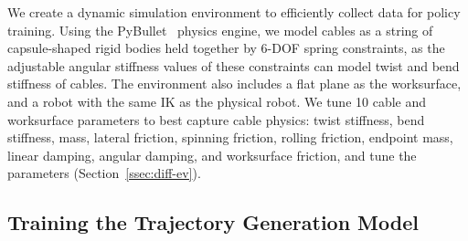 \documentclass[letterpaper, 10 pt, conference]{ieeeconf}  %
\newcommand{\remark}[3]{{\color{#2}[#1: #3]}}
\newcommand{\daniel}[1]{\remark{Daniel}{blue}{#1}}
\newcommand{\Vincent}[1]{\remark{Vincent}{purple}{#1}}
\newcommand{\jeffi}[1]{\remark{JI}{red}{#1}}
\begin{document}
We create a dynamic simulation environment to efficiently collect data for policy training. Using the PyBullet~\cite{coumans2019} physics engine, we model cables as a string of capsule-shaped rigid bodies held together by 6-DOF spring constraints, as the adjustable angular stiffness values of these constraints can model twist and bend stiffness of cables. The environment also includes a flat plane as the worksurface, and a robot with the same IK as the physical robot. We tune 10 cable and worksurface parameters to best capture cable physics: twist stiffness, bend stiffness, mass, lateral friction, spinning friction, rolling friction, endpoint mass, linear damping, angular damping, and worksurface friction, and tune the parameters (Section~\ref{ssec:diff-ev}).




\subsection{Training the Trajectory Generation Model} %
\label{ssec:supervised}

\end{document}
